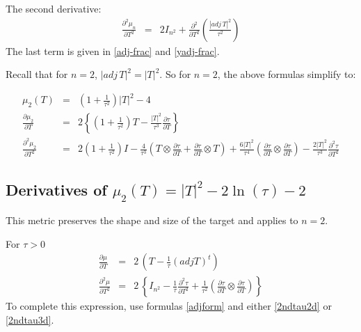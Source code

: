 \documentclass{report}
\begin{document}
\noindent The second derivative:
\begin{eqnarray}
\frac{\partial^2 \mu_n}{\partial T^2} & = & 2 I_{n^2} + \frac{\partial^2}{\partial T^2} \left( \frac{|adj \, T|^2}{\tau^2} \right)
\end{eqnarray}
The last term is given in \ref{adj-frac} and \ref{yadj-frac}. \newline

\noindent Recall that for $n=2$, $|adj \, T|^2=|T|^2$. So for $n=2$, the above formulas simplify to:

\begin{eqnarray}
\mu_2(T) & = & \left(1 + \frac{1}{\tau^2}\right) |T|^2 - 4 \\
\frac{ \partial \mu_2 }{ \partial T } & = & 2 \left\{ 
          \left(1 + \frac{1}{\tau^2}\right) T - \frac{|T|^2}{\tau^3} 
          \frac{\partial \tau}{\partial T} \right\} \\
\nonumber
\frac{\partial^2 \mu_2}{\partial T^2} & = &
          2 \left(1 + \frac{1}{\tau^2}\right) I -
          \frac{4}{\tau^3}\left( T \otimes \frac{\partial \tau}{\partial T} +
                                 \frac{\partial \tau}{\partial T} \otimes T \right) +
          \frac{6 |T|^2}{\tau^4}\left( \frac{\partial \tau}{\partial T} \otimes
                                       \frac{\partial \tau}{\partial T} \right) -
          \frac{2 |T|^2}{\tau^3}\frac{\partial^2 \tau}{\partial T^2}
\end{eqnarray}

\subsection{Derivatives of $\mu_2(T)=|T|^2 - 2 \ln(\tau) - 2$ \label{ss+22d} }

\noindent This metric preserves the shape and size of the target and applies
to $n=2$. \newline

\noindent For $\tau>0$
\begin{eqnarray}
\frac{\partial \mu}{\partial T} & = & 2 \, \left( T - \frac{1}{\tau} (adj T)^t \right) \\
\frac{\partial^2 \mu}{\partial T^2} & = & 2 \, \left\{ I_{n^2}  - \frac{1}{\tau} \frac{\partial^2 \tau}{\partial T^2} + \frac{1}{\tau^2} \left( \frac{\partial \tau}{\partial T} \otimes \frac{\partial \tau}{\partial T} \right) \right\}
\end{eqnarray}
To complete this expression, use formulas \ref{adjform} and either 
\ref{2ndtau2d} or \ref{2ndtau3d}. \newline
\end{document}
